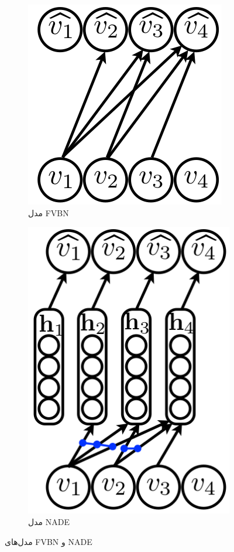 	\begin{figure}[!t]
		\centering
		\begin{subfigure}{0.4\textwidth}
			\centering
			\includegraphics[scale=0.25]{chap3-img/FVSBN}
			\caption{مدل FVBN}
			\label{chap3-fig2-1}
		\end{subfigure}		
		\begin{subfigure}{0.4\textwidth}
			\centering
			\includegraphics[scale=0.25]{chap3-img/NADE}
			\caption{مدل NADE}
			\label{chap3-fig2-2}
		\end{subfigure}
		\caption{مدل‌های FVBN و NADE}
		\label{chap3-fig2}
	\end{figure}


